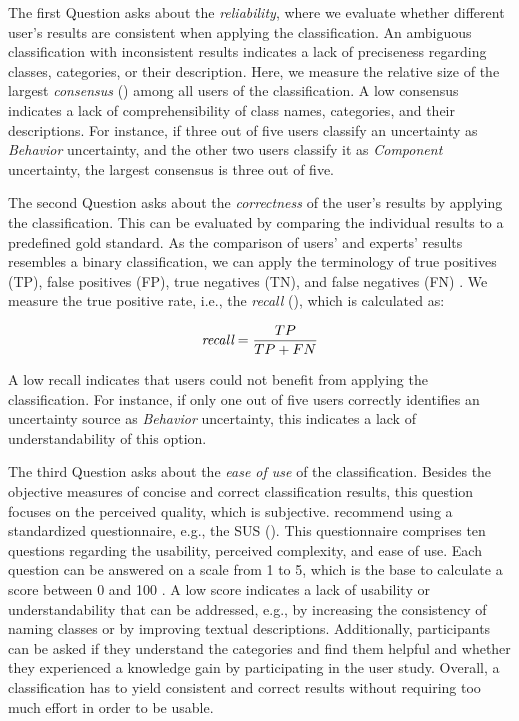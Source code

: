 \label{gqm:text:q:2:1}
The first Question  asks about the \emph{reliability}, where we evaluate whether different user's results are consistent when applying the classification.
An ambiguous classification with inconsistent results indicates a lack of preciseness regarding classes, categories, or their description.
Here, we measure the relative size of the largest \emph{consensus} (\label{gqm:text:m:2:1:1}) among all users of the classification.
A low consensus indicates a lack of comprehensibility of class names, categories, and their descriptions.
For instance, if three out of five users classify an uncertainty as \emph{Behavior} uncertainty, and the other two users classify it as \emph{Component} uncertainty, the largest consensus is three out of five.

\label{gqm:text:q:2:2}
The second Question  asks about the \emph{correctness} of the user's results by applying the classification.
This can be evaluated by comparing the individual results to a predefined gold standard.
As the comparison of users' and experts' results resembles a binary classification, we can apply the terminology of true positives (TP), false positives (FP), true negatives (TN), and false negatives (FN) \cite{powers_evaluation_2011,van_rijsbergen_information_1979}.
We measure the true positive rate, i.e., the \emph{recall} (\label{gqm:text:m:2:2:1}), which is calculated as:

\begin{equation*}
  \emph{recall} = \frac{TP}{TP + FN}
\end{equation*}

A low recall indicates that users could not benefit from applying the classification.
For instance, if only one out of five users correctly identifies an uncertainty source as \emph{Behavior} uncertainty, this indicates a lack of understandability of this option.

\label{gqm:text:q:2:3}
The third Question  asks about the \emph{ease of use} of the classification.
Besides the objective measures of concise and correct classification results, this question focuses on the perceived quality, which is subjective.
\textcite{kaplan_introducing_2022} recommend using a standardized questionnaire, e.g., the \acf{SUS} \cite{lewis_system_2018} (\label{gqm:text:m:2:3:1}).
This questionnaire comprises ten questions regarding the usability, perceived complexity, and ease of use.
Each question can be answered on a scale from 1 to 5, which is the base to calculate a score between 0 and 100 \cite{lewis_system_2018}.
A low score indicates a lack of usability or understandability that can be addressed, e.g., by increasing the consistency of naming classes or by improving textual descriptions.
Additionally, participants can be asked if they understand the categories and find them helpful and whether they experienced a knowledge gain by participating in the user study.
Overall, a classification has to yield consistent and correct results without requiring too much effort in order to be usable.


